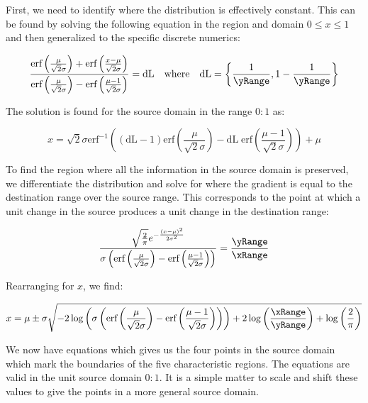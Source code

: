 First, we need to identify where the distribution is effectively constant. This can be found by solving the following equation in the region and domain $0 \le x \le 1$ and then generalized to the specific discrete numerics:

\begin{equation}\label{eq:0to1}
 \frac{\text{erf}\left(\frac{\mu }{\sqrt{2} \sigma }\right)+\text{erf}\left(\frac{x-\mu }{\sqrt{2} \sigma }\right)}{\text{erf}\left(\frac{\mu }{\sqrt{2} \sigma }\right)-\text{erf}\left(\frac{\mu -1}{\sqrt{2} \sigma }\right)}=\text{dL} \quad \text{where} \quad \text{dL} = \left\{ \frac{1}{\yRange}, 1 - \frac{1}{\yRange} \right\}
\end{equation}


The solution is found for the source domain in the range $0:1$ as:


\begin{equation}\label{eq:LowHigh}
 x = \sqrt{2} \sigma  \text{erf}^{-1}\left((\text{dL}-1) \text{erf}\left(\frac{\mu }{\sqrt{2} \sigma }\right)-\text{dL} \; \text{erf}\left(\frac{\mu -1}{\sqrt{2} \sigma }\right)\right)+\mu
\end{equation}

To find the region where all the information in the source domain is preserved, we differentiate the distribution and solve for where the gradient is equal to the destination range over the source range. This corresponds to the point at which a unit change in the source produces a unit change in the destination range:

\begin{equation}\label{eq:Boundaries}
\frac{\sqrt{\frac{2}{\pi }} e^{-\frac{(x-\mu )^2}{2 \sigma ^2}}}{\sigma  \left(\text{erf}\left(\frac{\mu }{\sqrt{2} \sigma }\right)-\text{erf}\left(\frac{\mu -1}{\sqrt{2} \sigma }\right)\right)}=\frac{\yRange}{\xRange}
\end{equation}

Rearranging for $x$, we find:

\begin{equation}\label{eq:PreservedRegion}
 x=\mu \pm \sigma  \sqrt{-2 \log \left(\sigma  \left(\text{erf}\left(\frac{\mu }{\sqrt{2} \sigma }\right)-\text{erf}\left(\frac{\mu -1}{\sqrt{2} \sigma }\right)\right)\right)+2 \log \left(\frac{\xRange}{\yRange}\right)+\log \left(\frac{2}{\pi }\right)}
\end{equation}

We now have equations which gives us the four points in the source domain which mark the boundaries of the five characteristic regions. The equations are valid in the unit source domain $0:1$. It is a simple matter to scale and shift these values to give the points in a more general source domain.


